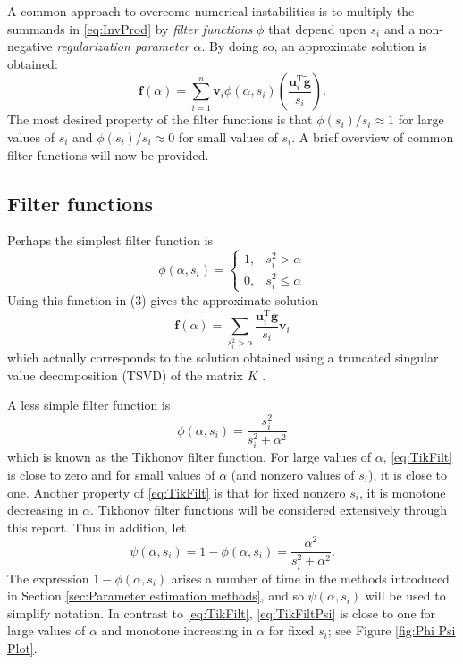 \documentclass[12pt]{article}
\newcommand{\gnoise}{\widetilde{\mathbf{g}}}
\newcommand{\kmat}{K}	%
\newcommand{\fdis}{\mathbf{f}}
\newcommand{\trans}{\mathrm{T}}	%
\newcommand{\regparam}{\alpha}
\newcommand{\filt}{\phi}
\newcommand{\mfilt}{\psi}
\newcommand{\singular}{s}	%
\newcommand{\LSV}{\mathbf{u}}	%
\newcommand{\RSV}{\mathbf{v}}	%
\begin{document}
A common approach to overcome numerical instabilities is to multiply the summands in \eqref{eq:InvProd} by \textit{filter functions} $\filt$ that depend upon $\singular_i$ and a non-negative \textit{regularization parameter} $\regparam$. By doing so, an approximate solution is obtained:
\begin{equation}
\fdis(\regparam) = \sum_{i = 1}^n \RSV_i\filt(\regparam,\singular_i)\left(\frac{{\LSV^\trans_i}\gnoise}{\singular_i}\right).
\label{eq:ApproxSol}
\end{equation}
The most desired property of the filter functions is that $\filt(\singular_i)/\singular_i \approx 1$  for large values of $\singular_i$ and $\filt(\singular_i)/\singular_i \approx 0$ for small values of $\singular_i$. A brief overview of common filter functions will now be provided. 

\subsection{Filter functions} \label{sec:Filter functions}
Perhaps the simplest filter function is
\[\filt(\regparam,\singular_i) = \begin{cases}
1, & \singular_i^2 > \regparam \\
0, & \singular_i^2 \leq \regparam
\end{cases}\]
Using this function in (3) gives the approximate solution
\[\fdis(\regparam) = \sum_{\singular_i^2 > \regparam} \frac{{\LSV^\trans_i}\gnoise}{\singular_i}\RSV_i\]
which actually corresponds to the solution obtained using a truncated singular value decomposition (TSVD) of the matrix $\kmat$ \cite{Vogel:2002}. \par
A less simple filter function is
\begin{equation}
\filt(\regparam,\singular_i)  = \frac{\singular_i^2}{\singular_i^2 + \regparam^2}
\label{eq:TikFilt}
\end{equation}
which is known as the Tikhonov filter function. For large values of $\regparam$, \eqref{eq:TikFilt} is close to zero and for small values of $\regparam$ (and nonzero values of $\singular_i$), it is close to one. Another property of \eqref{eq:TikFilt} is that for fixed nonzero $\singular_i$, it is monotone decreasing in $\regparam$. Tikhonov filter functions will be considered extensively through this report. Thus in addition, let
\begin{equation}
\mfilt(\regparam,\singular_i) = 1 - \filt(\regparam,\singular_i) = \frac{\regparam^2}{\singular_i^2 + \regparam^2}.
\label{eq:TikFiltPsi}
\end{equation}
The expression $1 - \filt(\regparam,\singular_i)$ arises a number of time in the methods introduced in Section \ref{sec:Parameter estimation methods}, and so $\mfilt(\regparam,\singular_i)$ will be used to simplify notation. In contrast to \eqref{eq:TikFilt}, \eqref{eq:TikFiltPsi} is close to one for large values of $\regparam$ and monotone increasing in $\regparam$ for fixed $\singular_i$; see Figure \ref{fig:Phi Psi Plot}. \par 
\end{document}

